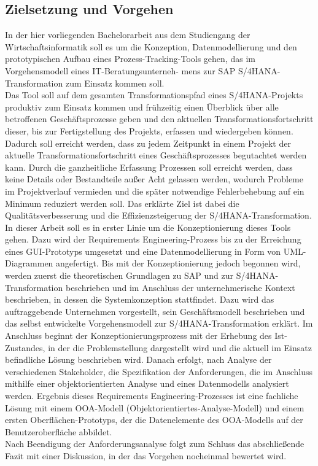 \subsection{Zielsetzung und Vorgehen}
In der hier vorliegenden Bachelorarbeit aus dem Studiengang der Wirtschaftsinformatik soll es um die Konzeption, Datenmodellierung und den prototypischen Aufbau eines Prozess-Tracking-Tools gehen, das im Vorgehensmodell eines IT-Beratungsunterneh- mens zur SAP S/4HANA-Transformation zum Einsatz kommen soll.\\ Das Tool soll auf dem gesamten Transformationspfad eines S/4HANA-Projekts produktiv zum Einsatz kommen und frühzeitig einen Überblick über alle betroffenen Geschäftsprozesse geben und den aktuellen Transformationsfortschritt dieser, bis zur Fertigstellung des Projekts, erfassen und wiedergeben können. Dadurch soll erreicht werden, dass zu jedem Zeitpunkt in einem Projekt der aktuelle Transformationsfortschritt eines Geschäftsprozesses begutachtet werden kann. Durch die ganzheitliche Erfassung Prozessen soll erreicht werden, dass keine Details oder Bestandteile außer Acht gelassen werden, wodurch Probleme im Projektverlauf vermieden und die später notwendige Fehlerbehebung auf ein Minimum reduziert werden soll. Das erklärte Ziel ist dabei die Qualitätsverbesserung und die Effizienzsteigerung der S/4HANA-Transformation.\\
In dieser Arbeit soll es in erster Linie um die Konzeptionierung dieses Tools gehen. Dazu wird der Requirements Engineering-Prozess bis zu der Erreichung eines GUI-Prototyps umgesetzt und eine Datenmodellierung in Form von UML-Diagrammen angefertigt. Bis mit der Konzeptionierung jedoch begonnen wird, werden zuerst die theoretischen Grundlagen zu SAP und zur S/4HANA-Transformation beschrieben und im Anschluss der unternehmerische Kontext beschrieben, in dessen die Systemkonzeption stattfindet. Dazu wird das auftraggebende Unternehmen vorgestellt, sein Geschäftsmodell beschrieben und das selbst entwickelte Vorgehensmodell zur S/4HANA-Transformation erklärt. Im Anschluss beginnt der Konzeptionierungsprozess mit der Erhebung des Ist-Zustandes, in der die Problemstellung dargestellt wird und die aktuell im Einsatz befindliche Lösung beschrieben wird. Danach erfolgt, nach Analyse der verschiedenen Stakeholder, die Spezifikation der Anforderungen, die im Anschluss mithilfe einer objektorientierten Analyse und eines Datenmodells analysiert werden. Ergebnis dieses Requirements Engineering-Prozesses ist eine fachliche Lösung mit einem OOA-Modell (Objektorientiertes-Analyse-Modell) und einem ersten Oberflächen-Prototyps, der die Datenelemente des OOA-Modells auf der Benutzeroberfläche abbildet.\\Nach Beendigung der Anforderungsanalyse folgt zum Schluss das abschließende Fazit mit einer Diskussion, in der das Vorgehen nocheinmal bewertet wird. 

